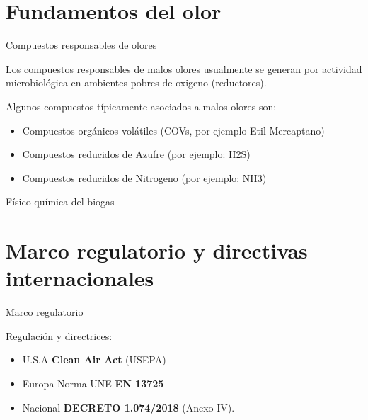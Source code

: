 \subtitle{Olores}
\begin{frame}
  \titlepage
\end{frame}
\section{Fundamentos del olor}

\begin{frame}{Compuestos responsables de olores}

Los compuestos responsables de malos olores usualmente se generan por actividad microbiológica en ambientes pobres de oxigeno (reductores).

Algunos compuestos típicamente asociados a malos olores son:
\begin{itemize}
    \item Compuestos orgánicos volátiles (COVs, por ejemplo Etil Mercaptano)
    \item Compuestos reducidos de Azufre (por ejemplo: H2S)
    \item Compuestos reducidos de Nitrogeno (por ejemplo: NH3)
\end{itemize}       
\end{frame}

\begin{frame}{Físico-química del biogas}





\end{frame}



\section{Marco regulatorio y directivas internacionales}
\begin{frame}{Marco regulatorio}
 
    
Regulación y directrices:

   \begin{itemize}
       \item \alert{U.S.A}    \textbf{Clean Air Act} (USEPA)
       \item \alert{Europa}   Norma UNE \textbf{EN 13725}
       \item \alert{Nacional} \textbf{DECRETO 1.074/2018} (Anexo IV).  
   \end{itemize}    
\end{frame}

